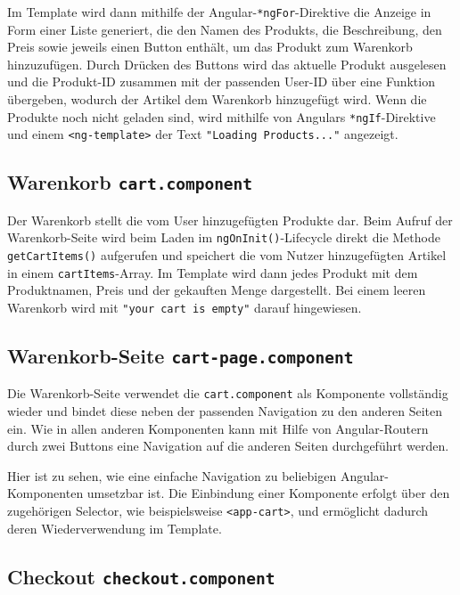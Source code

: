 \documentclass[oneside]{ausarbeitung}
\begin{document}
Im Template wird dann mithilfe der Angular-\texttt{*ngFor}-Direktive die Anzeige in Form einer Liste generiert, die den Namen des Produkts, die Beschreibung, den Preis sowie jeweils einen Button enthält, um das Produkt zum Warenkorb hinzuzufügen.
Durch Drücken des Buttons wird das aktuelle Produkt ausgelesen und die Produkt-ID zusammen mit der passenden User-ID über eine Funktion übergeben, wodurch der Artikel dem Warenkorb hinzugefügt wird.
Wenn die Produkte noch nicht geladen sind, wird mithilfe von Angulars \texttt{*ngIf}-Direktive und einem \texttt{<ng-template>} der Text \texttt{"Loading Products..."} angezeigt.


\subsection{Warenkorb \texttt{cart.component}}

Der Warenkorb stellt die vom User hinzugefügten Produkte dar. Beim Aufruf der Warenkorb-Seite wird beim Laden im \texttt{ngOnInit()}-Lifecycle direkt die Methode \texttt{getCartItems()} aufgerufen und speichert die vom Nutzer hinzugefügten Artikel in einem \texttt{cartItems}-Array. Im Template wird dann jedes Produkt mit dem Produktnamen, Preis und der gekauften Menge dargestellt. Bei einem leeren Warenkorb wird mit \texttt{"your cart is empty"} darauf hingewiesen.

\subsection{Warenkorb-Seite \texttt{cart-page.component}}

Die Warenkorb-Seite verwendet die \texttt{cart.component} als Komponente vollständig wieder und bindet diese neben der passenden Navigation zu den anderen Seiten ein. Wie in allen anderen Komponenten kann mit Hilfe von Angular-Routern durch zwei Buttons eine Navigation auf die anderen Seiten durchgeführt werden.



Hier ist zu sehen, wie eine einfache Navigation zu beliebigen Angular-Komponenten umsetzbar ist. Die Einbindung einer Komponente erfolgt über den zugehörigen Selector, wie beispielsweise \texttt{<app-cart>}, und ermöglicht dadurch deren Wiederverwendung im Template.

\subsection{Checkout \texttt{checkout.component}}
\end{document}
